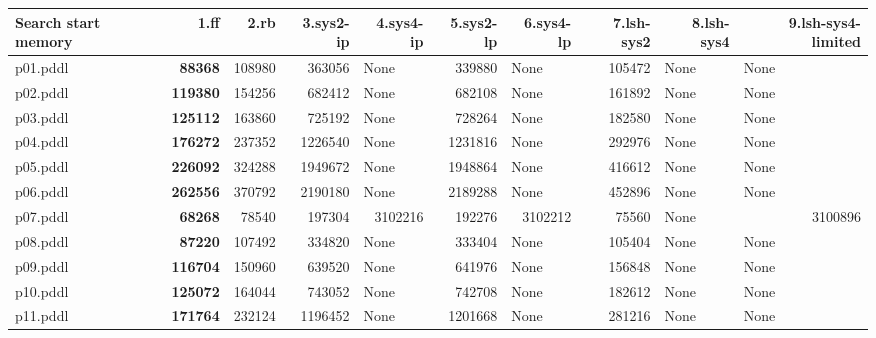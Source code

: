 \documentclass{article}
\begin{document}
\begin{tabular}{@{}lrrrrrrrrr@{}}
Search start memory & 1.ff & 2.rb & 3.sys2-ip & 4.sys4-ip & 5.sys2-lp & 6.sys4-lp & 7.lsh-sys2 & 8.lsh-sys4 & 9.lsh-sys4-limited \\
\midrule
p01.pddl & \textbf{88368} & 108980 & 363056 & \multicolumn{1}{|l|}{None} & 339880 & \multicolumn{1}{|l|}{None} & 105472 & \multicolumn{1}{|l|}{None} & \multicolumn{1}{|l|}{None} \\
p02.pddl & \textbf{119380} & 154256 & 682412 & \multicolumn{1}{|l|}{None} & 682108 & \multicolumn{1}{|l|}{None} & 161892 & \multicolumn{1}{|l|}{None} & \multicolumn{1}{|l|}{None} \\
p03.pddl & \textbf{125112} & 163860 & 725192 & \multicolumn{1}{|l|}{None} & 728264 & \multicolumn{1}{|l|}{None} & 182580 & \multicolumn{1}{|l|}{None} & \multicolumn{1}{|l|}{None} \\
p04.pddl & \textbf{176272} & 237352 & 1226540 & \multicolumn{1}{|l|}{None} & 1231816 & \multicolumn{1}{|l|}{None} & 292976 & \multicolumn{1}{|l|}{None} & \multicolumn{1}{|l|}{None} \\
p05.pddl & \textbf{226092} & 324288 & 1949672 & \multicolumn{1}{|l|}{None} & 1948864 & \multicolumn{1}{|l|}{None} & 416612 & \multicolumn{1}{|l|}{None} & \multicolumn{1}{|l|}{None} \\
p06.pddl & \textbf{262556} & 370792 & 2190180 & \multicolumn{1}{|l|}{None} & 2189288 & \multicolumn{1}{|l|}{None} & 452896 & \multicolumn{1}{|l|}{None} & \multicolumn{1}{|l|}{None} \\
p07.pddl & \textbf{68268} & 78540 & 197304 & 3102216 & 192276 & 3102212 & 75560 & \multicolumn{1}{|l|}{None} & 3100896 \\
p08.pddl & \textbf{87220} & 107492 & 334820 & \multicolumn{1}{|l|}{None} & 333404 & \multicolumn{1}{|l|}{None} & 105404 & \multicolumn{1}{|l|}{None} & \multicolumn{1}{|l|}{None} \\
p09.pddl & \textbf{116704} & 150960 & 639520 & \multicolumn{1}{|l|}{None} & 641976 & \multicolumn{1}{|l|}{None} & 156848 & \multicolumn{1}{|l|}{None} & \multicolumn{1}{|l|}{None} \\
p10.pddl & \textbf{125072} & 164044 & 743052 & \multicolumn{1}{|l|}{None} & 742708 & \multicolumn{1}{|l|}{None} & 182612 & \multicolumn{1}{|l|}{None} & \multicolumn{1}{|l|}{None} \\
p11.pddl & \textbf{171764} & 232124 & 1196452 & \multicolumn{1}{|l|}{None} & 1201668 & \multicolumn{1}{|l|}{None} & 281216 & \multicolumn{1}{|l|}{None} & \multicolumn{1}{|l|}{None} \\

\end{tabular}
\end{document}

